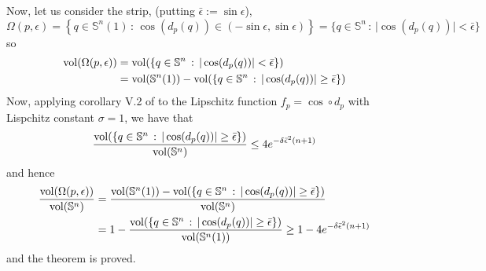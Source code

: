 \documentclass[11pt,letterpaper]{amsart}
\theoremstyle{definition}
\theoremstyle{remark}
\newcommand{\ese}{\mathbb{S}}
\begin{document}
Now, let us consider the strip, (putting $\bar \epsilon:= \sin \epsilon$),
$$\Omega(p,\epsilon)=\left\lbrace q\in \mathbb{S}^{n}(1)\, : \,   \cos\left(d_p(q)\right)\in ( -\sin\epsilon,\sin\epsilon) \right\rbrace=\{q\in \mathbb{S}^n\, : \, \vert \cos(d_p(q))\vert < \bar\epsilon \}$$
\noindent  so
$$\begin{aligned}
{\rm vol}(\Omega(p, \epsilon))&={\rm vol}(\{q\in \mathbb{S}^n\, : \, \vert \cos(d_p(q))\vert < \bar\epsilon \})\\&={\rm vol}(\ese^n(1))-{\rm vol}(\{q\in \mathbb{S}^n\, : \, \vert \cos(d_p(q))\vert \geq \bar\epsilon \})
\end{aligned}$$
Now, applying corollary V.2 of \cite{MS}  to the Lipschitz function $f_p=\cos\circ d_p$ with Lispchitz constant $\sigma=1$, we have that 
$$\frac{{\rm vol}(\{q\in \mathbb{S}^n\, : \, \vert \cos(d_p(q))\vert \geq \bar\epsilon \})}{{\rm vol}(\mathbb{S}^n)}\leq 4 e^{-\delta\bar\epsilon^2(n+1)}$$
\noindent  and hence
$$
\begin{aligned}
\frac{{\rm vol}(\Omega(p,\epsilon))}{{\rm vol}(\mathbb{S}^n)}&=\frac{ {\rm vol}(\ese^n(1))-{\rm vol}(\{q\in \mathbb{S}^n\, : \, \vert \cos(d_p(q))\vert \geq \bar\epsilon \})}{{\rm vol}(\mathbb{S}^n) }\\&=1-\frac{{\rm vol}(\{q\in \mathbb{S}^n\, : \, \vert \cos(d_p(q))\vert \geq \bar\epsilon \}) }{ {\rm vol}(\ese^n(1))}\geq 1-4e^{-\delta \bar\epsilon^2(n+1)}
\end{aligned}
$$
and the theorem is proved.
\end{document}
